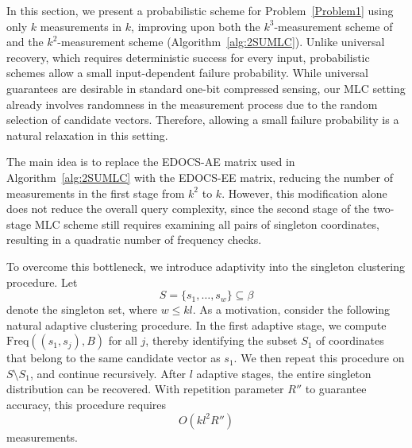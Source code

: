 \documentclass[10pt,a4paper]{amsart}
\newcommand{\xl}[1]{{\color{blue}#1}}
\begin{document}
In this section, we present a probabilistic scheme for Problem~\ref{Problem1} using only $k$ measurements in $k$, improving upon both the $k^3$-measurement scheme of~\cite{gandikota2020recovery} and the $k^2$-measurement scheme (Algorithm~\ref{alg:2SUMLC}). Unlike universal recovery, which requires deterministic success for every input, probabilistic schemes allow a small input-dependent failure probability. While universal guarantees are desirable in standard one-bit compressed sensing, our MLC setting already involves randomness in the measurement process due to the random selection of candidate vectors. Therefore, allowing a small failure probability is a natural relaxation in this setting.

The main idea is to replace the EDOCS-AE matrix used in Algorithm~\ref{alg:2SUMLC} with the EDOCS-EE matrix, reducing the number of measurements in the first stage from $k^2$ to $k$. However, this modification alone does not reduce the overall query complexity, since the second stage of the two-stage MLC scheme still requires examining all pairs of singleton coordinates, resulting in a quadratic number of frequency checks.


To overcome this bottleneck, we introduce adaptivity into the singleton clustering procedure. Let
\[
S=\{s_1,\ldots,s_w\}\subseteq\beta
\]
denote the singleton set, where $w\le kl$. As a motivation, consider the following natural adaptive clustering procedure. In the first adaptive stage, we compute $\mathrm{Freq}((s_1,s_j),B)$ for all $j$, thereby identifying the subset $S_1$ of coordinates that belong to the same candidate vector as $s_1$. We then repeat this procedure on $S\setminus S_1$, and continue recursively. After $l$ adaptive stages, the entire singleton distribution can be recovered. With repetition parameter $R''$ to guarantee accuracy, this procedure requires
\[
O(kl^2R'')
\]
measurements.
\end{document}
